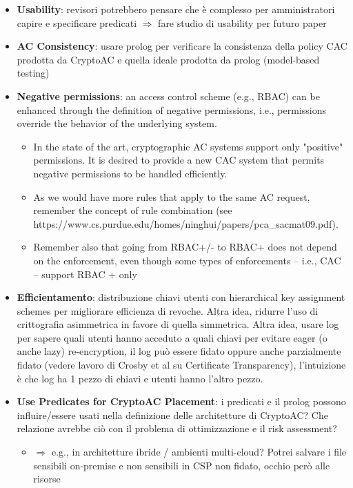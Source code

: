 \begin{itemize}
    \item \textbf{Usability}: revisori potrebbero pensare che è complesso per amministratori capire e specificare predicati \( \Rightarrow \) fare studio di usability per futuro paper
    
    \item \textbf{AC Consistency}: usare prolog per verificare la consistenza della policy CAC prodotta da CryptoAC e quella ideale prodotta da prolog (model-based testing)
    
    \item \textbf{Negative permissions}: an access control scheme (e.g., RBAC) can be enhanced through the definition of negative permissions, i.e., permissions override the behavior of the underlying system.
    \begin{itemize}
        \item In the state of the art, cryptographic AC systems support only "positive" permissions. It is desired to provide a new CAC system that permits negative permissions to be handled efficiently.
        \item As we would have more rules that apply to the same AC request, remember the concept of rule combination (see https://www.cs.purdue.edu/homes/ninghui/papers/pca_sacmat09.pdf).
        \item Remember also that going from RBAC+/- to RBAC+ does not depend on the enforcement, even though some types of enforcements -- i.e., CAC -- support RBAC + only
    \end{itemize}

    \item \textbf{Efficientamento}: distribuzione chiavi utenti con hierarchical key assignment schemes per migliorare efficienza di revoche. Altra idea, ridurre l'uso di crittografia asimmetrica in favore di quella simmetrica. Altra idea, usare log per sapere quali utenti hanno acceduto a quali chiavi per evitare eager (o anche lazy) re-encryption, il log può essere fidato oppure anche parzialmente fidato (vedere lavoro di Crosby et al su Certificate Transparency), l'intuizione è che log ha 1 pezzo di chiavi e utenti hanno l'altro pezzo.
    
    \item \textbf{Use Predicates for CryptoAC Placement}: i predicati e il prolog possono influire/essere usati nella definizione delle architetture di CryptoAC? Che relazione avrebbe ciò con il problema di ottimizzazione e il risk assessment?
    \begin{itemize}
        \item \( \Rightarrow \) e.g., in architetture ibride / ambienti multi-cloud? Potrei salvare i file sensibili on-premise e non sensibili in CSP non fidato, occhio però alle risorse
    \end{itemize}
\end{itemize}

